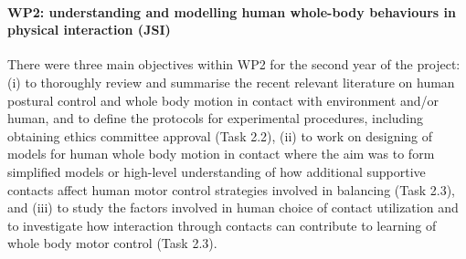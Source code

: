 \paragraph{WP2: understanding and modelling human whole-body behaviours in physical interaction (JSI)}

There were three main objectives within WP2 for the second year of the project: (i) to thoroughly review and summarise the recent relevant literature on human postural control and whole body motion in contact with environment and/or human, and to define the protocols for experimental procedures, including obtaining ethics committee approval (Task 2.2), (ii) to work on designing of models for human whole body motion in contact where the aim was to form simplified models or high-level understanding of how additional supportive contacts affect human motor control strategies involved in balancing (Task 2.3), and (iii) to study the factors involved in human choice of contact utilization and to investigate how interaction through contacts can contribute to learning of whole body motor control (Task 2.3).